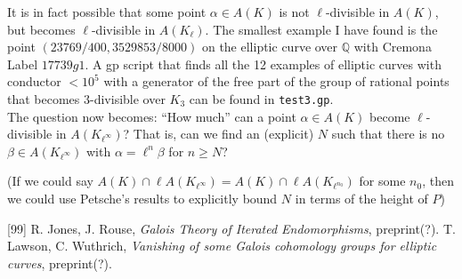 \documentclass[10pt,a4paper]{article}
\newcommand{\kiu}{\mathbb{Q}}
\theoremstyle{definition}
\begin{document}
It is in fact possible that some point $\alpha\in A(K)$ is not $\ell$-divisible in $A(K)$, but becomes $\ell$-divisible in $A(K_\ell)$. The smallest example I have found is the point 
$(23769/400, 3529853/8000)$ on the elliptic curve over $\kiu$ with Cremona Label $17739g1$. A gp script that finds all the 12 examples of elliptic curves with conductor $<10^5$ with a generator of the free part of the group of rational points that becomes $3$-divisible over $K_3$ can be found in \texttt{test3.gp}.
\\

The question now becomes: ``How much'' can a point $\alpha\in A(K)$ become $\ell$-divisible in $A(K_{\ell^\infty})$? That is, can we find an (explicit) $N$ such that there is no $\beta\in A(K_{\ell^\infty})$ with $\alpha=\ell^n\beta$ for $n\geq N$?



(If we could say $A(K)\cap\ell A(K_{\ell^\infty})=A(K)\cap\ell A(K_{\ell^{n_0}})$ for some $n_0$, then we could use Petsche's results to explicitly bound $N$ in terms of the height of $P$)

\begin{thebibliography}{[99]}
 R. Jones, J. Rouse, \emph{Galois Theory of Iterated Endomorphisms}, preprint(?).
 T. Lawson, C. Wuthrich, \emph{Vanishing of some Galois cohomology groups for elliptic curves}, preprint(?).
\end{thebibliography} 
\end{document}
